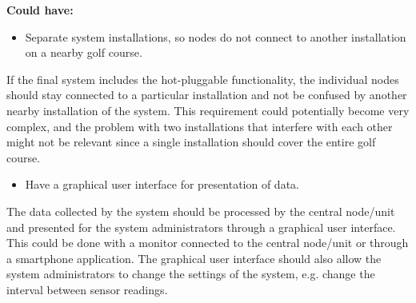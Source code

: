 \textbf{Could have:}
\begin{itemize}
\item Separate system installations, so nodes do not connect to another installation on a nearby golf course.
\end{itemize}
If the final system includes the hot-pluggable functionality, the individual nodes should stay connected to a particular installation and not be confused by another nearby installation of the system. This requirement could potentially become very complex, and the problem with two installations that interfere with each other might not be relevant since a single installation should cover the entire golf course.

\begin{itemize}
\item Have a graphical user interface for presentation of data.
\end{itemize}
The data collected by the system should be processed by the central node/unit and presented for the system administrators through a graphical user interface. This could be done with a monitor connected to the central node/unit or through a smartphone application. The graphical user interface should also allow the system administrators to change the settings of the system, e.g. change the interval between sensor readings.







